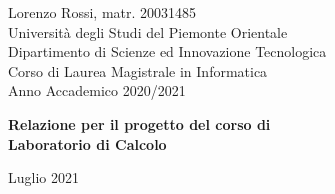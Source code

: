 \begin{titlepage}
	\voffset=8mm
	\begin{center}
		\large{Lorenzo Rossi, matr. 20031485}\\
		\large{Universit\`a degli Studi del Piemonte Orientale}\\
		\large{Dipartimento di Scienze ed Innovazione Tecnologica}\\
		\large{Corso di Laurea Magistrale in Informatica}\\
		\large{Anno Accademico 2020/2021}
		
		\vspace*{1.5cm}
		
		\LARGE{\textbf{Relazione per il progetto del corso di\\Laboratorio di Calcolo}}
			
		
		\vfill
		
		
		
		\vspace*{1.5cm}
		
		\large{Luglio 2021}
	\end{center}
\end{titlepage}